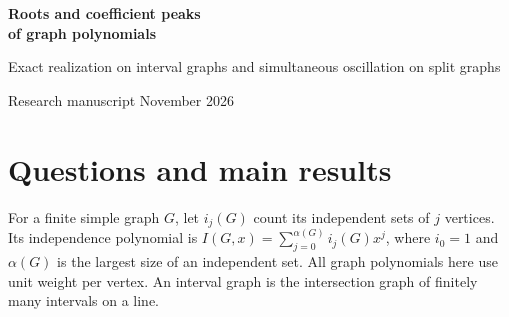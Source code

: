 \documentclass[11pt,a4paper]{article}
\begin{document}
\thispagestyle{plain}
\begin{center}
{\LARGE\bfseries\color{ink}Roots and coefficient peaks\\[2pt] of graph polynomials}\par\vspace{7pt}
{\large Exact realization on interval graphs and simultaneous oscillation on split graphs}\par\vspace{7pt}
{\small Research manuscript  November 2026}
\end{center}
\begin{abstract}
Which algebraic numbers are zeros of independence polynomials of interval graphs?
We prove that a nonzero number $z$ occurs exactly when $1/z$ is an algebraic integer with no positive real conjugate. More generally, every $p\in\mathbb Z[x]$ with $p(0)=1$ that is positive on the nonnegative axis occurs as an integral factor. We construct the entire multiple $(1+Mx)(1+x)^N p(x)$ for each sufficiently large $M$. The construction gives an exact answer to the interval-graph location question of Brown, Hickman and Nowakowski. In Cameron's question about purely imaginary roots of modulus greater than one, the smallest possible independence number is six. At that independence number the purely imaginary roots are already dense on the imaginary axis. We classify the roots of three domination polynomials and realize the full independent and total domination spectra on trees. Further consequences include counterexamples to the fixed-order Roller-Coaster Conjecture of Levit and Mandrescu, a family of connected split graphs on which the ordinary, total and connected domination polynomials and the connected-set polynomial have arbitrarily many common high coefficients separated by valleys of relative depth at least $\exp(c_r |V|^{1/5})$ for fixed peak count $r$, and a one-factor completion theorem for right-angled Coxeter growth denominators.
\end{abstract}
\section{Questions and main results}
For a finite simple graph $G$, let $i_j(G)$ count its independent sets of $j$ vertices. Its independence polynomial is $I(G,x)=\sum_{j=0}^{\alpha(G)} i_j(G)x^j$, where $i_0=1$ and $\alpha(G)$ is the largest size of an independent set. All graph polynomials here use unit weight per vertex. An interval graph is the intersection graph of finitely many intervals on a line.
\end{document}
